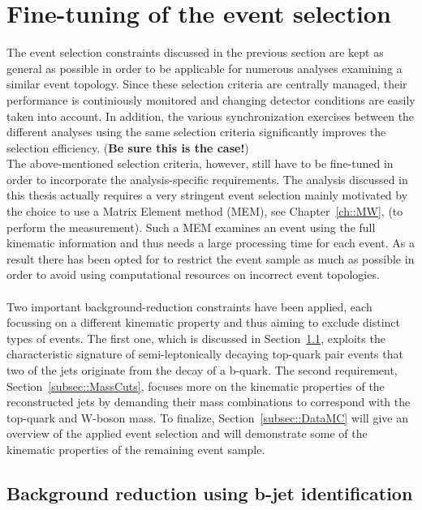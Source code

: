 \section{Fine-tuning of the event selection}\label{sec::SpecificSelec}

The event selection constraints discussed in the previous section are kept as general as possible in order to be applicable for numerous analyses examining a similar event topology.
Since these selection criteria are centrally managed, their performance is continiously monitored and changing detector conditions are easily taken into account.
In addition, the various synchronization exercises between the different analyses using the same selection criteria significantly improves the selection efficiency. (\textbf{Be sure this is the case!})
\\

The above-mentioned selection criteria, however, still have to be fine-tuned in order to incorporate the analysis-specific requirements.
The analysis discussed in this thesis actually requires a very stringent event selection mainly motivated by the choice to use a Matrix Element method (MEM), see Chapter~\ref{ch::MW}, (to perform the measurement). Such a MEM examines an event using the full kinematic information and thus needs a large processing time for each event. As a result there has been opted for to restrict the event sample as much as possible in order to avoid using computational resources on incorrect event topologies.
\\
\\
Two important background-reduction constraints have been applied, each focussing on a different kinematic property and thus aiming to exclude distinct types of events. 
The first one, which is discussed in Section~\ref{subsec::BTag}, exploits the characteristic signature of semi-leptonically decaying top-quark pair events that two of the jets originate from the decay of a b-quark. The second requirement, Section~\ref{subsec::MassCuts}, focuses more on the kinematic properties of the reconstructed jets by demanding their mass combinations to correspond with the top-quark and W-boson mass.
To finalize, Section~\ref{subsec::DataMC} will give an overview of the applied event selection and will demonstrate some of the kinematic properties of the remaining event sample.

\subsection{Background reduction using b-jet identification}\label{subsec::BTag}

